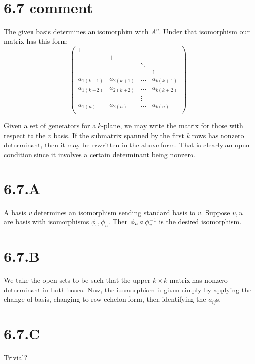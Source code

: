 \documentclass{article}
\begin{document}
\section{6.7 comment}
The given basis determines an isomorphim with $A^n$. Under that isomorphism our matrix has this form:
\[
    \begin{pmatrix}
        1          &            &        &            \\
                   & 1          &        &            \\
                   &            & \ddots &            \\
                   &            &        & 1          \\
        a_{1(k+1)} & a_{2(k+1)} & \dots  & a_{k(k+1)} \\
        a_{1(k+2)} & a_{2(k+2)} & \dots  & a_{k(k+2)} \\
                   &            & \vdots &            \\
        a_{1(n)}   & a_{2(n)}   & \dots  & a_{k(n)}   \\
    \end{pmatrix}
\]

Given a set of generators for a $k$-plane, we may write the matrix for those with respect to the $v$ basis. If the submatrix spanned by the first $k$ rows has nonzero determinant, then it may be rewritten in the above form. That is clearly an open condition since it involves a certain determinant being nonzero.

\section{6.7.A}
A basis $v$ determines an isomorphism sending standard basis to $v$. Suppose $v, u$ are basis with isomorphisms $\phi_v, \phi_u$. Then $\phi_u \circ \phi^{-1}_v$ is the desired isomorphism.

\section{6.7.B}
We take the open sets to be such that the upper $k\times k$ matrix has nonzero determinant in both bases. Now, the isomorphism is given simply by applying the change of basis, changing to row echelon form, then identifying the $a_{ij}$s.

\section{6.7.C}
Trivial?
\end{document}
